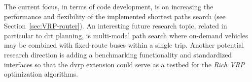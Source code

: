 The current focus, in terms of code development, is on increasing the performance and flexibility of the implemented shortest paths search (see Section~\ref{sec:VRP-router}). An interesting future research topic, related in particular to \gls{drt} planning, is multi-modal path search where on-demand vehicles may be combined with fixed-route buses within a single trip. Another potential research direction is adding a benchmarking functionality and standardized interfaces so that the \gls{dvrp} extension could serve as a testbed for the \emph{Rich VRP} optimization algorithms.

